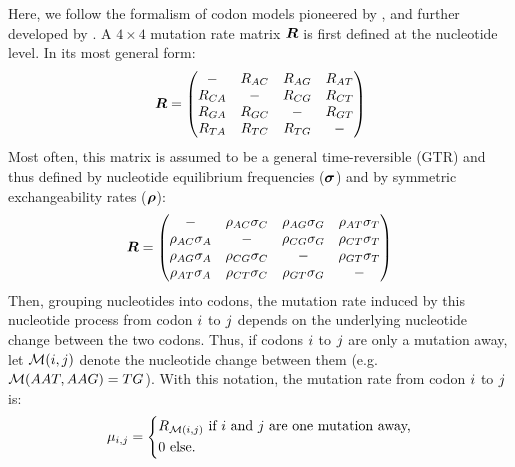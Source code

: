Here, we follow the formalism of codon models pioneered by \citet{Muse1994}, and further developed by \citet{Nielsen1998}.
A $4 \times 4$ mutation rate matrix $\bm{R}$ is first defined at the nucleotide level.
In its most general form:
\begin{equation}
    \label{eq:mutrates}
    \bm{R} =
    \begin{pmatrix}
        - & {R_{AC}} & {R_{AG}} & {R_{AT}} \\
        {R_{CA}} &                 - & {R_{CG}} & {R_{CT}} \\
        {R_{GA}} & {R_{GC}} &                 - & {R_{GT}} \\
        {R_{TA}} & {R_{TC}} & {R_{TG}} & -
    \end{pmatrix}
\end{equation}
Most often, this matrix is assumed to be a general time-reversible (GTR) and thus defined by nucleotide equilibrium frequencies ($\bm{\sigma}$) and by symmetric exchangeability rates ($\bm{\rho}$):
\begin{equation}
    \label{eq:mutrates-GTR}
    \bm{R} =
    \begin{pmatrix}
        - & {\rho_{AC}\sigma_C} & {\rho_{AG}\sigma_G} & {\rho_{AT}\sigma_T} \\
        {\rho_{AC}\sigma_A} &                        - & {\rho_{CG}\sigma_G} & {\rho_{CT}\sigma_T} \\
        {\rho_{AG}\sigma_A} & {\rho_{CG}\sigma_C} &                        - & {\rho_{GT}\sigma_T} \\
        {\rho_{AT}\sigma_A} & {\rho_{CT}\sigma_C} & {\rho_{GT}\sigma_G} & -
    \end{pmatrix}
\end{equation}
Then, grouping nucleotides into codons, the mutation rate induced by this nucleotide process from codon ${i}$ to ${j}$ depends on the underlying nucleotide change between the two codons.
Thus, if codons ${i}$ to ${j}$ are only a mutation away, let $\mathcal{M}({i}, {j})$ denote the nucleotide change between them (e.g. $\mathcal{M}(AAT, AAG) = TG$).
With this notation, the mutation rate from codon ${i}$ to ${j}$ is:
\begin{equation}
    \mu_{{i}, {j}} =
    \begin{dcases}
        R_{\mathcal{M}({i}, {j})} \text{ if ${i}$ and ${j}$ are one mutation away,} \\
        0 \text{ else.}
    \end{dcases}
\end{equation}

